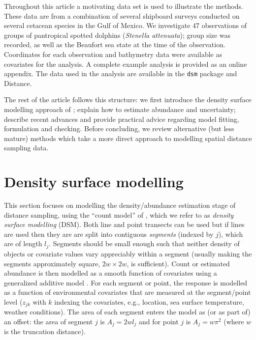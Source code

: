 \documentclass[a4paper,12pt]{article}
\begin{document}
Throughout this article a motivating data set is used to illustrate the methods. These data are from a combination of several shipboard surveys conducted on several cetacean species in the Gulf of Mexico. We investigate 47 observations of groups of pantropical spotted dolphins (\textit{Stenella attenuata}); group size was recorded, as well as the Beaufort sea state at the time of the observation. Coordinates for each observation and bathymetry data were available as covariates for the analysis. A complete example analysis is provided as an online appendix. The data used in the analysis are available in the \texttt{dsm} package and Distance.

The rest of the article follows this structure: we first introduce the density surface modelling approach of \cite{Hedley:2004et}; explain how to estimate abundance and uncertainty; describe recent advances and provide practical advice regarding model fitting, formulation and checking. Before concluding, we review alternative (but less mature) methods which take a more direct approach to modelling spatial distance sampling data.


\section*{Density surface modelling}
\label{s:dsm}

This section focuses on modelling the density/abundance estimation stage of distance sampling, using the ``count model'' of \cite{Hedley:2004et}, which we refer to as \textit{density surface modelling} (DSM). Both line and point transects can be used but if lines are used then they are are split into contiguous \textit{segments} (indexed by $j$), which are of length $l_j$. Segments should be small enough such that neither density of objects or covariate values vary appreciably within a segment (usually making the segments approximately square, $2w\times 2w$, is sufficient). Count or estimated abundance is then modelled as a smooth function of covariates using a generalized additive model \cite[GAM; e.g.][]{Wood:2006wz}. For each segment or point, the response is modelled as a function of environmental covariates that are measured at the segment/point level ($z_{jk}$ with $k$ indexing the covariates, e.g., location, sea surface temperature, weather conditions). The area of each segment enters the model as (or as part of) an offset: the area of segment $j$ is $A_j = 2wl_j$ and for point $j$ is $A_j=w\pi^2$ (where $w$ is the truncation distance). 
\end{document}
